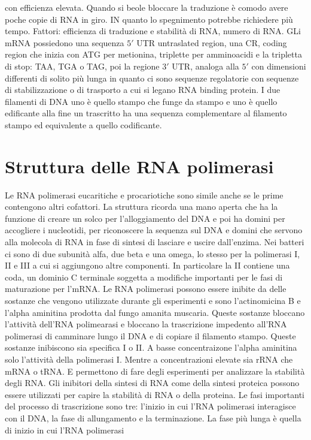 con efficienza elevata. Quando si beole bloccare la traduzione \`e comodo avere poche copie di RNA in giro. IN quanto lo spegnimento potrebbe richiedere pi\`u tempo. Fattori: efficienza
di traduzione e stabilit\`a di RNA, numero di RNA. GLi mRNA possiedono una sequenza $5'$ UTR untraslated region, una CR, coding region che inizia con ATG per metionina, triplette per
amminoacidi e la tripletta di stop: TAA, TGA o TAG, poi la regione $3'$ UTR, analoga alla $5'$ con dimensioni differenti di solito pi\`u lunga in quanto ci sono sequenze regolatorie 
con sequenze di stabilizzazione o di trasporto a cui si legano RNA binding protein. I due filamenti di DNA uno \`e quello stampo che funge da stampo e uno \`e quello edificante alla fine
un trascritto ha una sequenza complementare al filamento stampo ed equivalente a quello codificante.
\section{Struttura delle RNA polimerasi}
Le RNA polimerasi eucaritiche e procariotiche sono simile anche se le prime contengono altri cofattori. La struttura ricorda una mano aperta che ha la funzione di creare un solco per
l'alloggiamento del DNA e poi ha domini per accogliere i nucleotidi, per riconoscere la sequenza sul DNA e domini che servono alla molecola di RNA in fase di sintesi di lasciare e 
uscire dall'enzima. Nei batteri ci sono di due subunit\`a alfa, due beta e una omega, lo stesso per la polimerasi I, II e III a cui si aggiungono altre componenti. In particolare la
II contiene una coda, un dominio C terminale soggetta a modifiche importanti per le fasi di maturazione per l'mRNA. Le RNA polimerasi possono essere inibite da delle sostanze che 
vengono utilizzate durante gli esperimenti e sono l'actinomicina B e l'alpha aminitina prodotta dal fungo amanita muscaria. Queste sostanze bloccano l'attivit\`a dell'RNA polimearasi e 
bloccano la trascrizione impedento all'RNA polimerasi di camminare lungo il DNA e di copiare il filamento stampo. Queste sostanze inibiscono sia specifica I o II. A basse concentraizone
l'alpha aminitina solo l'attivit\`a della polimerasi I. Mentre a concentrazioni elevate sia rRNA che mRNA o tRNA. E permettono di fare degli esperimenti per analizzare la stabilit\`a 
degli RNA. Gli inibitori della sintesi di RNA come della sintesi proteica possono essere utilizzati per capire la stabilit\`a di RNA o della proteina. Le fasi importanti del processo di
trascrizione sono tre: l'inizio in cui l'RNA polimerasi interagisce con il DNA, la fase di allungamento e la terminazione. La fase pi\`u lunga \`e quella di inizio in cui l'RNA polimerasi
